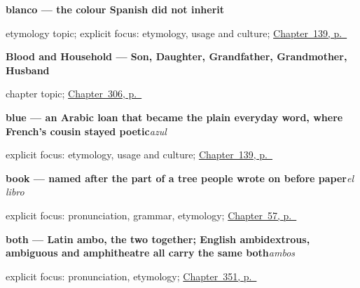 \noindent\begin{minipage}[t]{\linewidth}
\raggedright
\textbf{blanco — the colour Spanish did not inherit}\par
\footnotesize etymology topic; explicit focus: etymology, usage and culture; \hyperref[ch:spanish-black-white-red-blue]{Chapter~139, p.~\pageref*{ch:spanish-black-white-red-blue}}
\end{minipage}\par\smallskip

\noindent\begin{minipage}[t]{\linewidth}
\raggedright
\textbf{Blood and Household --- Son, Daughter, Grandfather, Grandmother, Husband}\par
\footnotesize chapter topic; \hyperref[ch:hijos-y-abuelos]{Chapter~306, p.~\pageref*{ch:hijos-y-abuelos}}
\end{minipage}\par\smallskip

\noindent\begin{minipage}[t]{\linewidth}
\raggedright
\textbf{blue — an Arabic loan that became the plain everyday word, where French's cousin stayed poetic}\enspace\emph{azul}\par
\footnotesize explicit focus: etymology, usage and culture; \hyperref[ch:spanish-black-white-red-blue]{Chapter~139, p.~\pageref*{ch:spanish-black-white-red-blue}}
\end{minipage}\par\smallskip

\noindent\begin{minipage}[t]{\linewidth}
\raggedright
\textbf{book — named after the part of a tree people wrote on before paper}\enspace\emph{el libro}\par
\footnotesize explicit focus: pronunciation, grammar, etymology; \hyperref[ch:noun-libro]{Chapter~57, p.~\pageref*{ch:noun-libro}}
\end{minipage}\par\smallskip

\noindent\begin{minipage}[t]{\linewidth}
\raggedright
\textbf{both — Latin ambo, the two together; English ambidextrous, ambiguous and amphitheatre all carry the same both}\enspace\emph{ambos}\par
\footnotesize explicit focus: pronunciation, etymology; \hyperref[ch:cien-y-la-cantidad]{Chapter~351, p.~\pageref*{ch:cien-y-la-cantidad}}
\end{minipage}\par\smallskip

